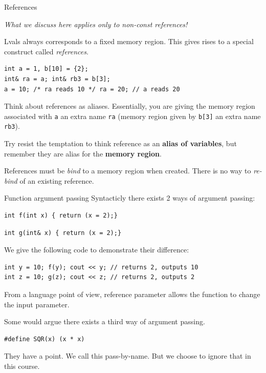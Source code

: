 \begin{frame}[fragile]{References}

\textit{What we discuss here applies only to non-const references!}

Lvals always corresponds to a fixed memory region. This gives rises to a special construct called \textit{references}. 

\begin{verbatim}
int a = 1, b[10] = {2};
int& ra = a; int& rb3 = b[3];
a = 10; /* ra reads 10 */ ra = 20; // a reads 20
\end{verbatim}

Think about references as aliases. Essentially, you are giving the memory region associated with \texttt{a} an extra name \texttt{ra} (memory region given by \texttt{b[3]} an extra name \texttt{rb3}). 

Try resist the temptation to think reference as an \textbf{alias of variables}, but remember they are alias for the \textbf{memory region}.

References must be \textit{bind} to a memory region when created. There is no way to \textit{re-bind} of an existing reference. 
\end{frame}

\begin{frame}[fragile]{Function argument passing}
Syntacticly there exists 2 ways of argument passing:

\begin{verbatim}
int f(int x) { return (x = 2);}
\end{verbatim} 

\begin{verbatim}
int g(int& x) { return (x = 2);}
\end{verbatim} 

We give the following code to demonstrate their difference:
\begin{verbatim}
int y = 10; f(y); cout << y; // returns 2, outputs 10
int z = 10; g(z); cout << z; // returns 2, outputs 2
\end{verbatim}
From a language point of view, reference parameter allows the function to change the input parameter. 

Some would argue there exists a third way of argument passing. 
\begin{verbatim}
#define SQR(x) (x * x)
\end{verbatim}
They have a point. We call this pass-by-name. But we choose to ignore that in this course.

\end{frame}

